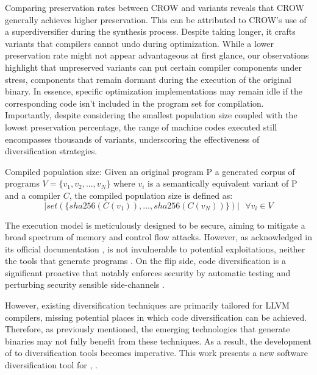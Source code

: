 Comparing preservation rates between CROW and \tool variants reveals that CROW generally achieves higher preservation. 
This can be attributed to CROW's use of a superdiversifier during the synthesis process. 
Despite taking longer, it crafts variants that compilers cannot undo during optimization. 
While a lower preservation rate might not appear advantageous at first glance, our observations highlight that unpreserved variants can put certain compiler components under stress, components that remain dormant during the execution of the original binary. 
In essence, specific optimization implementations may remain idle if the corresponding code isn't included in the \wasm program set for compilation. 
Importantly, despite considering the smallest population size coupled with the lowest preservation percentage, the range of machine codes executed still encompasses thousands of variants, underscoring the effectiveness of diversification strategies.




\begin{metric}{Compiled population size:}\label{metric:popcomp}
Given an original \wasm program P a generated corpus of \wasm programs $V=\{v_1, v_2, ..., v_N\}$ where $v_i$ is a semantically equivalent variant of P and a compiler $C$, the compiled population size is defined as:
$$
    | set(\{ sha256(C(v_1)),..., sha256(C(v_N)) \})|\text{ } \forall v_i \in V 
$$

\end{metric}



The \wasm execution model is meticulously designed to be secure, aiming to mitigate a broad spectrum of memory and control flow attacks.
However, as acknowledged in its official documentation \cite{WebAssemblySecurity}, \wasm is not invulnerable to potential exploitations, neither the tools that generate \Wasm programs \cite{usenixWASM2020, stievenart2021security}.
On the flip side, code diversification is a significant proactive that notably enforces security by automatic testing and perturbing security sensible side-channels \cite{arteaga2020crow, MEWE, CABRERAARTEAGA2023103296}.


However, existing diversification techniques are primarily tailored for LLVM compilers, missing potential places in which code diversification can be achieved.
Therefore, as previously mentioned, the emerging technologies that generate \wasm binaries may not fully benefit from these techniques.
As a result, the development of \Wasm to \Wasm diversification tools becomes imperative.
This work presents a new software diversification tool for \Wasm, \tool.




